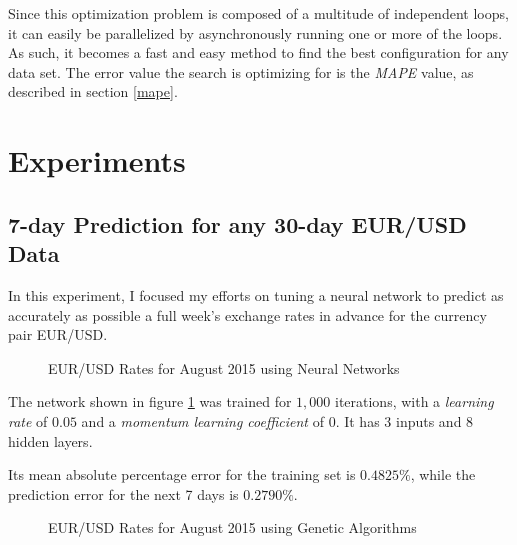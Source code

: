 \documentclass[a4paper,12pt]{article}
\begin{document}
	Since this optimization problem is composed of a multitude of independent loops, it can easily be parallelized by asynchronously running one or more of the loops. As such, it becomes a fast and easy method to find the best configuration for any data set. The error value the search is optimizing for is the \textit{MAPE} value, as described in section \ref{mape}.
	
\section{Experiments}
\subsection{7-day Prediction for any 30-day EUR/USD Data} \label{pred730nn}
	
	In this experiment, I focused my efforts on tuning a neural network to predict as accurately as possible a full week's exchange rates in advance for the currency pair EUR/USD.
	
	\begin{figure}[!htbp]
		\centering
		\caption{EUR/USD Rates for August 2015 using Neural Networks}
		\label{eur_usd_august_30_neuron}
	\end{figure}
	
	The network shown in figure \ref{eur_usd_august_30_neuron} was trained for $1,000$ iterations, with a \textit{learning rate} of $0.05$ and a \textit{momentum learning coefficient} of $0$. It has $3$ inputs and $8$ hidden layers.
	
	Its mean absolute percentage error for the training set is $0.4825\%$, while the prediction error for the next 7 days is $0.2790\%$.
	
	\begin{figure}[!htbp]
		\centering
		\caption{EUR/USD Rates for August 2015 using Genetic Algorithms}
		\label{eur_usd_august_30_genetic}
	\end{figure}
	
\end{document}
